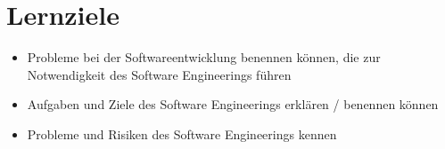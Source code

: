 \section{Lernziele}
\begin{itemize}
    \item Probleme bei der Softwareentwicklung benennen können, die zur Notwendigkeit des Software Engineerings führen
    \item Aufgaben und Ziele des Software Engineerings erklären / benennen können
    \item Probleme und Risiken des Software Engineerings kennen
\end{itemize}